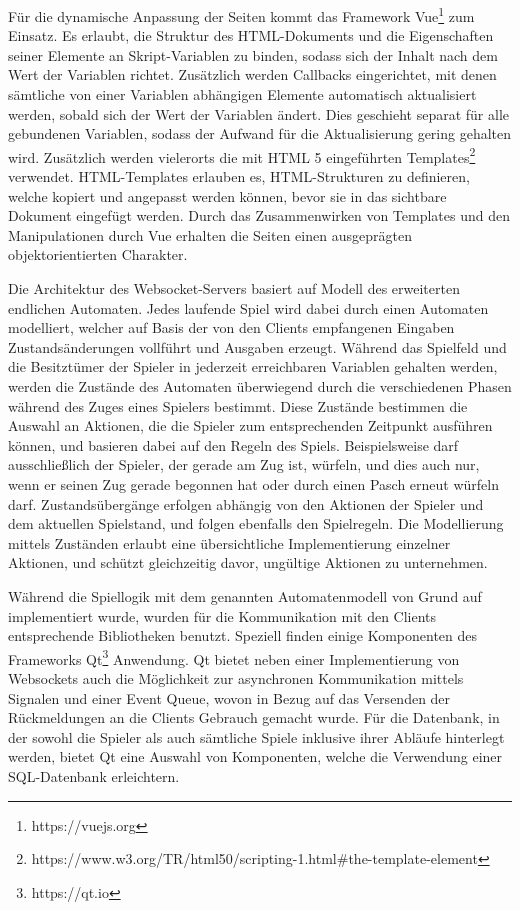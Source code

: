 \documentclass[german]{cgspaper} %
\begin{document}
Für die dynamische Anpassung der Seiten kommt das Framework Vue\footnote{https://vuejs.org} zum Einsatz.
Es erlaubt, die Struktur des HTML-Dokuments und die Eigenschaften seiner Elemente an Skript-Variablen zu binden, sodass sich der Inhalt nach dem Wert der Variablen richtet.
Zusätzlich werden Callbacks eingerichtet, mit denen sämtliche von einer Variablen abhängigen Elemente automatisch aktualisiert werden, sobald sich der Wert der Variablen ändert.
Dies geschieht separat für alle gebundenen Variablen, sodass der Aufwand für die Aktualisierung gering gehalten wird.
Zusätzlich werden vielerorts die mit HTML 5 eingeführten Templates\footnote{https://www.w3.org/TR/html50/scripting-1.html\#the-template-element} verwendet.
HTML-Templates erlauben es, HTML-Strukturen zu definieren, welche kopiert und angepasst werden können, bevor sie in das sichtbare Dokument eingefügt werden.
Durch das Zusammenwirken von Templates und den Manipulationen durch Vue erhalten die Seiten einen ausgeprägten objektorientierten Charakter.

Die Architektur des Websocket-Servers basiert auf Modell des erweiterten endlichen Automaten.
Jedes laufende Spiel wird dabei durch einen Automaten modelliert, welcher auf Basis der von den Clients empfangenen Eingaben Zustandsänderungen vollführt und Ausgaben erzeugt.
Während das Spielfeld und die Besitztümer der Spieler in jederzeit erreichbaren Variablen gehalten werden, werden die Zustände des Automaten überwiegend durch die verschiedenen Phasen während des Zuges eines Spielers bestimmt.
Diese Zustände bestimmen die Auswahl an Aktionen, die die Spieler zum entsprechenden Zeitpunkt ausführen können, und basieren dabei auf den Regeln des Spiels.
Beispielsweise darf ausschließlich der Spieler, der gerade am Zug ist, würfeln, und dies auch nur, wenn er seinen Zug gerade begonnen hat oder durch einen Pasch erneut würfeln darf.
Zustandsübergänge erfolgen abhängig von den Aktionen der Spieler und dem aktuellen Spielstand, und folgen ebenfalls den Spielregeln.
Die Modellierung mittels Zuständen erlaubt eine übersichtliche Implementierung einzelner Aktionen, und schützt gleichzeitig davor, ungültige Aktionen zu unternehmen.

Während die Spiellogik mit dem genannten Automatenmodell von Grund auf implementiert wurde, wurden für die Kommunikation mit den Clients entsprechende Bibliotheken benutzt.
Speziell finden einige Komponenten des Frameworks Qt\footnote{https://qt.io} Anwendung.
Qt bietet neben einer Implementierung von Websockets auch die Möglichkeit zur asynchronen Kommunikation mittels Signalen und einer Event Queue, wovon in Bezug auf das Versenden der Rückmeldungen an die Clients Gebrauch gemacht wurde.
Für die Datenbank, in der sowohl die Spieler als auch sämtliche Spiele inklusive ihrer Abläufe hinterlegt werden, bietet Qt eine Auswahl von Komponenten, welche die Verwendung einer SQL-Datenbank erleichtern.
\end{document}
